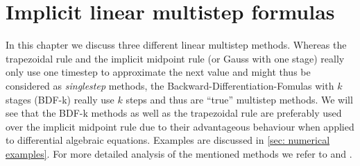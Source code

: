 \section{Implicit linear multistep formulas}
In this chapter we discuss three different linear multistep methods. Whereas the trapezoidal rule and the implicit midpoint rule (or Gauss with one stage) really only use one timestep to approximate the next value and might thus be considered as \emph{singlestep} methods, the Backward-Differentiation-Fomulas with $k$ stages (BDF-k) really use $k$ steps and thus are ``true'' multistep methods.
We will see that the BDF-k methods as well as the trapezoidal rule are preferably used over the implicit midpoint rule due to their advantageous behaviour when applied to differential algebraic equations. Examples are discussed in \ref{sec: numerical examples}. For more detailed analysis of the mentioned methods we refer to \cite{NumerikGewöhnlicherDifferentialgleichungen} and \cite{HairerErnst1989Tnso}.

%

